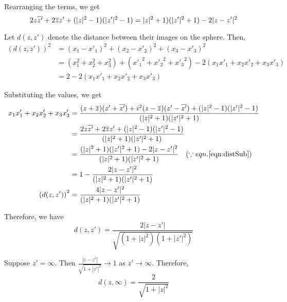 \noindent Rearranging the terms, we get
\begin{equation}
	2z\overline{z'}+2\overline{z}z' + (|z|^2-1)(|{z'}|^2-1) = |z|^2+1)(|{z'}|^2+1) - 2|z-{z'}|^2
	\label{eqn:distSub}
\end{equation}

\noindent Let $d(z,z')$ denote the distance between their images on the sphere.
Then,
\begin{align*}
	\left( d(z,z') \right)^2
	& = (x_1-x'_1)^2+(x_2-x'_2)^2+(x_3-x'_3)^2 \\
	& = (x_1^2+x_2^2+x_3^2) + ({x'_1}^2+{x'_2}^2+{x'_3}^2) -2(x_1x'_1+x_2x'_2+x_3x'_3) \\
	& = 2 - 2(x_1x'_1+x_2x'_2+x_3x'_3)
\end{align*}

\noindent Substituting the values, we get
\begin{align*}
	x_1x'_1+x_2x'_2+x_3x'_3
	& = \frac{(z+\overline{z})(z'+\overline{z'}) + i^2(z-\overline{z})(z'-\overline{z'}) + (|z|^2-1)(|{z'}|^2-1) }{ (|z|^2+1)(|{z'}|^2+1) } \\
	& = \frac{2z\overline{z'}+2\overline{z}z'+(|z|^2-1)(|{z'}|^2-1)}{ (|z|^2+1)(|{z'}|^2+1) } \\
	& = \frac{(|z|^2+1)(|{z'}|^2+1)-2|{z-z'}|^2}{ (|z|^2+1)(|{z'}|^2+1) } \quad (\because eqn.\ref{eqn:distSub}) \\
	& = 1-\frac{2|{z-z'}|^2}{ (|z|^2+1)(|{z'}|^2+1) } \\
	\left( d(z,z') \right)^2
	& = \frac{4|{z-z'}|^2}{ (|z|^2+1)(|{z'}|^2+1) } 
\end{align*}

\noindent Therefore, we have
\begin{equation}
	d(z,z')= \frac{2|z-z'|}{\sqrt{(1+|z|^2)(1+|z'|^2)}}
	\label{eqn:distRiemann}
\end{equation}

Suppose $z' = \infty$.
Then $\frac{|z-z'|}{\sqrt{1+|z'|^2}} \to 1$ as $z' \to \infty$.
Therefore,
\begin{equation}
	d(z,\infty)= \frac{2}{\sqrt{1+|z|^2}}
	\label{eqn:distRiemannInfinity}
\end{equation}

